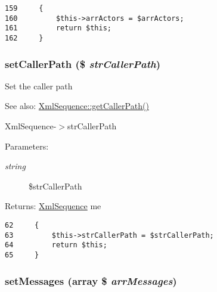 \begin{Code}\begin{verbatim}159     {
160         $this->arrActors = $arrActors;
161         return $this;
162     }
\end{verbatim}
\end{Code}


\hypertarget{class_xml_sequence_bdded6991e674ce82f04f701972ebf9f}{
\subsubsection[{setCallerPath}]{\setlength{\rightskip}{0pt plus 5cm}setCallerPath (\$ {\em strCallerPath})}}
\label{class_xml_sequence_bdded6991e674ce82f04f701972ebf9f}


Set the caller path

\begin{Desc}
\item[See also:]\hyperlink{class_xml_sequence_a8c839c9d33ebad153541a31ffc7ef3e}{XmlSequence::getCallerPath()} 

XmlSequence-$>$strCallerPath \end{Desc}
\begin{Desc}
\item[Parameters:]
\begin{description}
\item[{\em string}]\$strCallerPath \end{description}
\end{Desc}
\begin{Desc}
\item[Returns:]\hyperlink{class_xml_sequence}{XmlSequence} me \end{Desc}


\begin{Code}\begin{verbatim}62     {
63         $this->strCallerPath = $strCallerPath;
64         return $this;
65     }
\end{verbatim}
\end{Code}


\hypertarget{class_xml_sequence_f0c179f1eb00eaaafb9d18f7a330b86f}{
\subsubsection[{setMessages}]{\setlength{\rightskip}{0pt plus 5cm}setMessages (array \$ {\em arrMessages})}}
\label{class_xml_sequence_f0c179f1eb00eaaafb9d18f7a330b86f}


